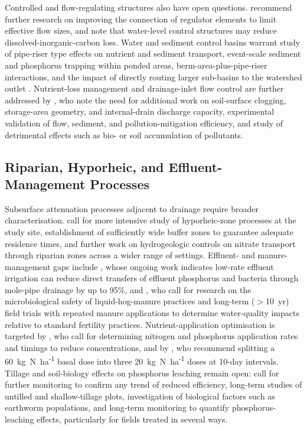 \documentclass[11pt]{article}
\begin{document}
Controlled and flow-regulating structures also have open questions. \textcite{Popek2021} recommend further research on improving the connection of regulator elements to limit effective flow sizes, and \textcite{Schilling2023} note that water-level control structures may reduce dissolved-inorganic-carbon loss. Water and sediment control basins warrant study of pipe-riser type effects on nutrient and sediment transport, event-scale sediment and phosphorus trapping within ponded areas, berm-area-plus-pipe-riser interactions, and the impact of directly routing larger sub-basins to the watershed outlet \parencite{Gupta2019}. Nutrient-loss management and drainage-inlet flow control are further addressed by \textcite{Nédélec2010}, who note the need for additional work on soil-surface clogging, storage-area geometry, and internal-drain discharge capacity, experimental validation of flow, sediment, and pollution-mitigation efficiency, and study of detrimental effects such as bio- or soil accumulation of pollutants.

\subsection{Riparian, Hyporheic, and Effluent-Management Processes}
Subsurface attenuation processes adjacent to drainage require broader characterisation. \textcite{Puckett2005} call for more intensive study of hyporheic-zone processes at the study site, establishment of sufficiently wide buffer zones to guarantee adequate residence times, and further work on hydrogeologic controls on nitrate transport through riparian zones across a wider range of settings. Effluent- and manure-management gaps include \textcite{Monaghan2007}, whose ongoing work indicates low-rate effluent irrigation can reduce direct transfers of effluent phosphorus and bacteria through mole-pipe drainage by up to 95\%, and \textcite{Gordon2005}, who call for research on the microbiological safety of liquid-hog-manure practices and long-term ($>$10~yr) field trials with repeated manure applications to determine water-quality impacts relative to standard fertility practices. Nutrient-application optimisation is targeted by \textcite{Farahani2020}, who call for determining nitrogen and phosphorus application rates and timings to reduce concentrations, and by \textcite{Singh2002}, who recommend splitting a 60~kg~N~ha\textsuperscript{-1} basal dose into three 20~kg~N~ha\textsuperscript{-1} doses at 10-day intervals. Tillage and soil-biology effects on phosphorus leaching remain open: \textcite{Ulén2018} call for further monitoring to confirm any trend of reduced efficiency, long-term studies of untilled and shallow-tillage plots, investigation of biological factors such as earthworm populations, and long-term monitoring to quantify phosphorus-leaching effects, particularly for fields treated in several ways.
\end{document}
